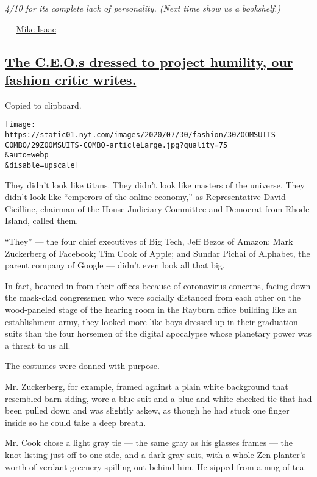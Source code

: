 \emph{4/10 for its complete lack of personality. (Next time show us a
bookshelf.)}

--- \href{https://www.nytimes.com/by/mike-isaac}{Mike Isaac}

\hypertarget{the-ceos-dressed-to-project-humility-our-fashion-critic-writes}{%
\subsection{\texorpdfstring{\protect\hyperlink{the-ceos-dressed-to-project-humility-our-fashion-critic-writes}{The
C.E.O.s dressed to project humility, our fashion critic
writes.}}{The C.E.O.s dressed to project humility, our fashion critic writes.}}\label{the-ceos-dressed-to-project-humility-our-fashion-critic-writes}}

Copied to clipboard.

\texttt{[image: https://static01.nyt.com/images/2020/07/30/fashion/30ZOOMSUITS-COMBO/29ZOOMSUITS-COMBO-articleLarge.jpg?quality=75\\\&auto=webp\\\&disable=upscale]}

They didn't look like titans. They didn't look like masters of the
universe. They didn't look like ``emperors of the online economy,'' as
Representative David Cicilline, chairman of the House Judiciary
Committee and Democrat from Rhode Island, called them.

``They'' --- the four chief executives of Big Tech, Jeff Bezos of
Amazon; Mark Zuckerberg of Facebook; Tim Cook of Apple; and Sundar
Pichai of Alphabet, the parent company of Google --- didn't even look
all that big.

In fact, beamed in from their offices because of coronavirus concerns,
facing down the mask-clad congressmen who were socially distanced from
each other on the wood-paneled stage of the hearing room in the Rayburn
office building like an establishment army, they looked more like boys
dressed up in their graduation suits than the four horsemen of the
digital apocalypse whose planetary power was a threat to us all.

The costumes were donned with purpose.

Mr. Zuckerberg, for example, framed against a plain white background
that resembled barn siding, wore a blue suit and a blue and white
checked tie that had been pulled down and was slightly askew, as though
he had stuck one finger inside so he could take a deep breath.

Mr. Cook chose a light gray tie --- the same gray as his glasses frames
--- the knot listing just off to one side, and a dark gray suit, with a
whole Zen planter's worth of verdant greenery spilling out behind him.
He sipped from a mug of tea.

